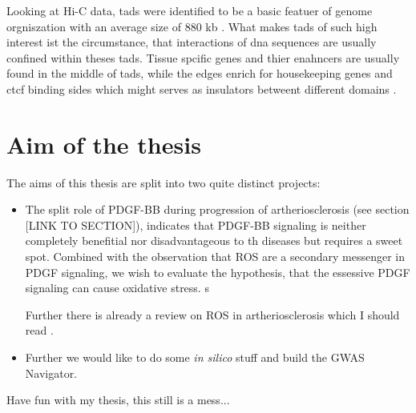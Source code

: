     Looking at Hi-C data, \acp{tad} were identified to be a basic featuer of genome orgniszation with an average size of 880 kb \cite{dixonTopologicalDomainsMammalian2012, wang3DGenomeBrowser2018}. What makes \acp{tad} of such high interest ist the circumstance, that interactions of \ac{dna} sequences are usually confined within theses \acp{tad}. Tissue spcific genes and thier enahncers are usually found in the middle of \acp{tad}, while the edges enrich for housekeeping genes and \ac{ctcf} binding sides which might serves as insulators betweent different domains \cite{pomboThreedimensionalGenomeArchitecture2015}.


\section{Aim of the thesis}
\label{sec:Aim}
The aims of this thesis are split into two quite distinct projects:

\begin{itemize}
    \item The split role of PDGF-BB during progression of artheriosclerosis (see section [LINK TO SECTION]), indicates that PDGF-BB signaling is neither completely benefitial nor disadvantageous to th diseases but requires a sweet spot. Combined with the observation that ROS are a secondary messenger in PDGF signaling, we wish to evaluate the hypothesis, that the essessive PDGF signaling can cause oxidative stress. s


    Further there is already a review on ROS in artheriosclerosis which I should read \cite{burtenshawReactiveOxygenSpecies2019}.
    \item Further we would like to do some \textit{in silico} stuff and build the GWAS Navigator.
\end{itemize}

Have fun with my thesis, this still is a mess...
